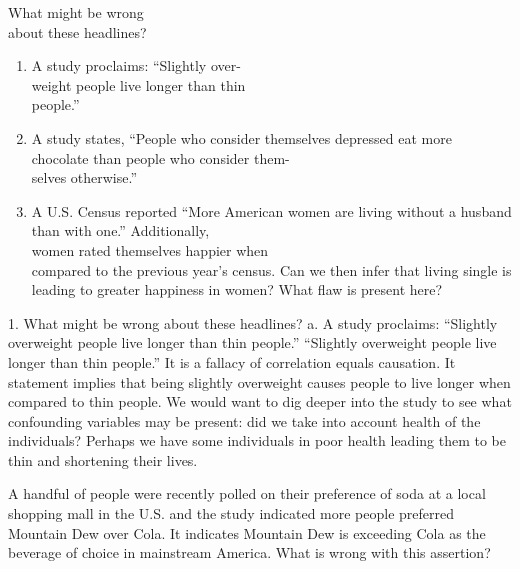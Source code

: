 \documentclass[11pt, chapterprefix=true]{scrbook}\usepackage[]{graphicx}\usepackage[]{color}
\begin{document}
\begin{exercises}
  \begin{exercise}  %

  What might be wrong \\ about these headlines?

  \begin{enumerate}
  \item A study proclaims: ``Slightly over- \\ weight people live longer than thin \\ people.''
  \item A study states, ``People who consider themselves depressed eat more chocolate  than people who consider them- \\ selves  otherwise.''
  \item A U.S. Census reported ``More American women are living without a husband than with one.''  Additionally, \\ women rated  themselves happier when \\ compared to the previous year's census.  Can we then infer that living single is leading to greater happiness in women?  What flaw is present here?
  \end{enumerate}

  \end{exercise}
  \begin{solution}  %

1.  What might be wrong about these headlines?
  a.	A study proclaims: ``Slightly overweight people live longer than thin people.'' ``Slightly overweight people live longer than thin people.''  It is a fallacy of correlation equals causation.  It statement implies that being slightly overweight causes people to live longer when compared to thin people.  We would want to dig deeper into the study to see what confounding variables may be present: did we take into account health of the individuals?  Perhaps we have some individuals in poor health leading them to be thin and shortening their lives.

  \end{solution}

   \begin{exercise}  %

A handful of people were recently polled on their preference of soda at a local shopping mall in the U.S. and the study indicated more people preferred \\ Mountain Dew over Cola.  It indicates  Mountain Dew is exceeding Cola as the beverage of choice in mainstream America.  What is wrong with this assertion?


\end{exercise}
\end{exercises}
\end{document}
